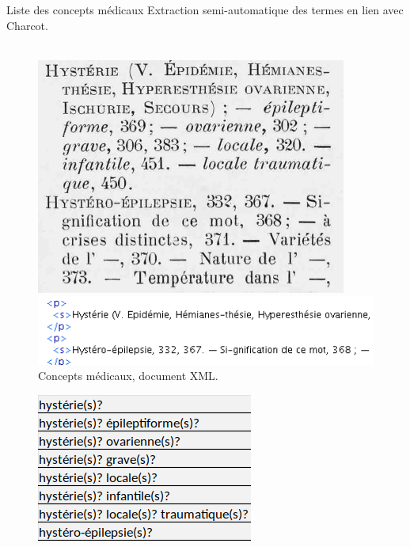 \begin{frame}{Liste des concepts médicaux}
Extraction semi-automatique des termes en lien avec Charcot.\\~\\

 \begin{figure}[!htb]
    \centering
    \begin{minipage}{.5\textwidth}
        \centering
        \includegraphics[width=0.6\linewidth, height=0.3\textheight]{pic/concepts-pdf}
        \caption{Index des termes \citep{charcot1890oeuvres}.}
        \label{fig:prob1_6_2}
    \end{minipage}%
    \begin{minipage}{.5\textwidth}
        \centering
        \includegraphics[width=1\linewidth, height=0.15\textheight]{pic/concepts-xml}
        \caption{Concepts médicaux, document XML.}
        \label{fig:prob1_6_1}
    \end{minipage}
\end{figure}
\begin{figure}[!htb]
    \centering
    \begin{minipage}{.5\textwidth}
        \centering
        \includegraphics[width=0.6\linewidth, height=0.25\textheight]{pic/concepts-csv}

\end{minipage}
\end{figure}
\end{frame}
